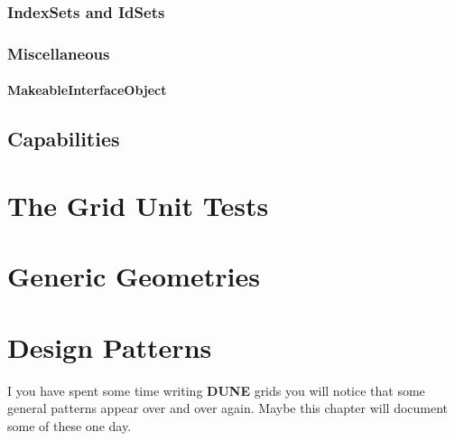 \documentclass[11pt,a4paper,headinclude,footinclude,DIV16,normalheadings]{scrreprt}
\newcommand{\Dune}{{\sf\bfseries DUNE}\xspace}
\begin{document}
\subsection{IndexSets and IdSets}

\subsection{Miscellaneous}

\subsubsection{MakeableInterfaceObject}

\section{Capabilities}

\chapter{The Grid Unit Tests}

\chapter{Generic Geometries}

\chapter{Design Patterns}

I you have spent some time writing \Dune grids you will notice that
some general patterns appear over and over again.  Maybe this chapter
will document some of these one day.




\printindex
\end{document}
